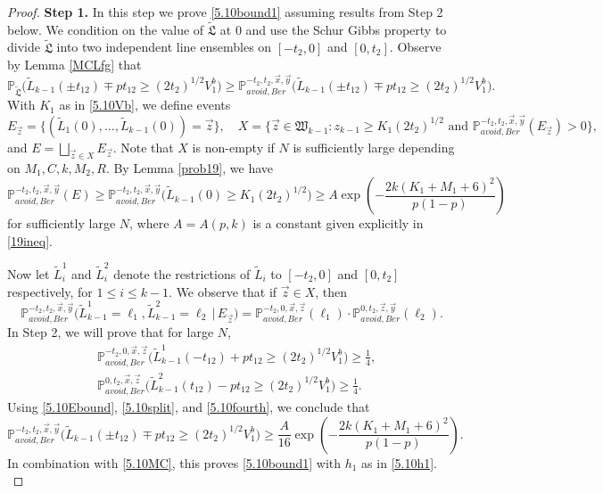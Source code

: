 \begin{proof}
	\noindent\textbf{Step 1.} In this step we prove \eqref{5.10bound1} assuming results from Step 2 below. We condition on the value of $\tilde{\mathfrak{L}}$ at 0 and use the Schur Gibbs property to divide $\tilde{\mathfrak{L}}$ into two independent line ensembles on $[-t_2,0]$ and $[0,t_2]$. Observe by Lemma \ref{MCLfg} that
	\begin{equation}\label{5.10MC}
	\mathbb{P}_{\tilde{\mathfrak{L}}}\Big(\tilde{L}_{k-1}(\pm t_{12}) \mp pt_{12} \geq (2t_2)^{1/2}V_1^b\Big) \geq \mathbb{P}^{-t_2,t_2,\vec{x},\vec{y}}_{avoid, Ber}\Big(\tilde{L}_{k-1}(\pm t_{12}) \mp pt_{12} \geq (2t_2)^{1/2}V_1^b\Big).
	\end{equation}
	With $K_1$ as in \eqref{5.10Vb}, we define events
	\[
	E_{\vec{z}} = \big\{(\tilde{L}_1(0),\dots,\tilde{L}_{k-1}(0)) = \vec{z}\big\}, \quad X = \Big\{ \vec{z}\in\mathfrak{W}_{k-1} : z_{k-1} \geq K_1(2t_2)^{1/2} \mbox { and } \mathbb{P}^{-t_2,t_2,\vec{x},\vec{y}}_{avoid,Ber}(E_{\vec{z}}) > 0\Big\},
	\]
	and $E = \bigsqcup_{\vec{z} \in X} E_{\vec{z}}$. Note that $X$ is non-empty if $N$ is sufficiently large depending on $M_1,C,k,M_2,R$. By Lemma \ref{prob19}, we have
	\begin{equation}\label{5.10Ebound}
	\mathbb{P}^{-t_2,t_2,\vec{x},\vec{y}}_{avoid, Ber}(E) \geq \mathbb{P}^{-t_2,t_2,\vec{x},\vec{y}}_{avoid,Ber}\Big(\tilde{L}_{k-1}(0) \geq K_1(2t_2)^{1/2}\Big) \geq A\exp\left(-\frac{2k(K_1+M_1+6)^2}{p(1-p)}\right)
	\end{equation}
	for sufficiently large $N$, where $A = A(p,k)$ is a constant given explicitly in \eqref{19ineq}.
	
	Now let $\tilde{L}_i^1$ and $\tilde{L}_i^2$ denote the restrictions of $\tilde{L}_i$ to $[-t_2,0]$ and $[0,t_2]$ respectively, for $1\leq i\leq k-1$. We observe that if $\vec{z}\in X$, then
	\begin{equation}\label{5.10split}
	\mathbb{P}^{-t_2,t_2,\vec{x},\vec{y}}_{avoid,Ber}\big(\tilde{L}^1_{k-1} = \ell_1, \tilde{L}^2_{k-1} = \ell_2 \, |\, E_{\vec{z}}\big) = \mathbb{P}^{-t_2,0,\vec{x},\vec{z}}_{avoid,Ber}(\ell_1)\cdot\mathbb{P}^{0,t_2,\vec{z},\vec{y}}_{avoid,Ber}(\ell_2).
	\end{equation}
	In Step 2, we will prove that for large $N$,
	\begin{equation}\label{5.10fourth}
	\begin{split}
	&\mathbb{P}^{-t_2,0,\vec{x},\vec{z}}_{avoid,Ber}\Big(\tilde{L}^1_{k-1}(-t_{12}) + pt_{12} \geq (2t_2)^{1/2}V_1^b\Big) \geq \frac{1}{4},\\
	&\mathbb{P}^{0,t_2,\vec{x},\vec{z}}_{avoid,Ber}\Big(\tilde{L}^2_{k-1}(t_{12}) - pt_{12} \geq (2t_2)^{1/2}V_1^b\Big) \geq \frac{1}{4}.
	\end{split}
	\end{equation}
	Using \eqref{5.10Ebound}, \eqref{5.10split}, and \eqref{5.10fourth}, we conclude that
	\[
	\mathbb{P}^{-t_2,t_2,\vec{x},\vec{y}}_{avoid, Ber}\Big(\tilde{L}_{k-1}(\pm t_{12}) \mp pt_{12} \geq (2t_2)^{1/2}V_1^b\Big) \geq \frac{A}{16}\exp\left(-\frac{2k(K_1+M_1+6)^2}{p(1-p)}\right).
	\]
	In combination with \eqref{5.10MC}, this proves \eqref{5.10bound1} with $h_1$ as in \eqref{5.10h1}.\\
	

\end{proof}
